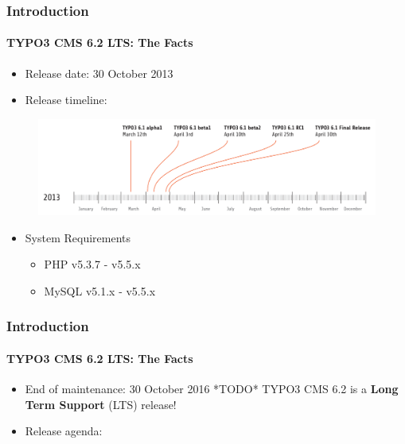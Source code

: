 
\begin{frame}[fragile]

	\frametitle{Introduction}
	\framesubtitle{TYPO3 CMS 6.2 LTS: The Facts}

	\begin{itemize}
		\item Release date: 30 October 2013
		\item Release timeline:
	\end{itemize}

	\begin{figure}
		\includegraphics[width=0.99\linewidth]{Images/Introduction/ReleaseTimeline.png}
	\end{figure}

	\begin{itemize}
		\item System Requirements
		\begin{itemize}
			\item PHP	\tabto{1.2cm} v5.3.7 - v5.5.x
			\item MySQL	\tabto{1.2cm} v5.1.x - v5.5.x
		\end{itemize}
	\end{itemize}

\end{frame}


\begin{frame}[fragile]
	\frametitle{Introduction}
	\framesubtitle{TYPO3 CMS 6.2 LTS: The Facts}

	\begin{itemize}
		\item End of maintenance: 30 October 2016 *TODO*\newline
			TYPO3 CMS 6.2 is a \textbf{Long Term Support} (LTS) release!
		\item Release agenda:
	\end{itemize}


\end{frame}


